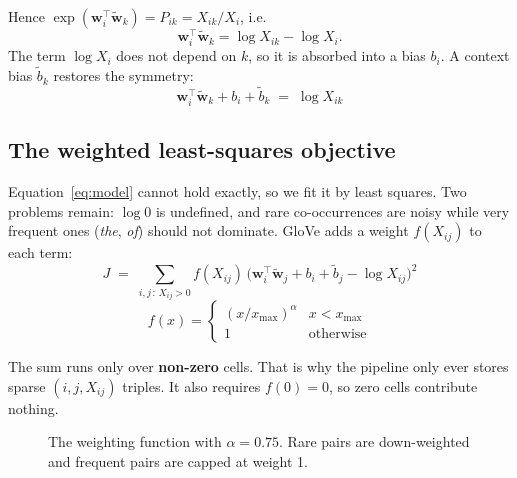 \documentclass[11pt,a4paper]{article}
\newcommand{\file}[1]{\texttt{#1}}
\newcommand{\wv}{\mathbf{w}}
\newcommand{\cv}{\tilde{\mathbf{w}}}
\begin{document}
Hence $\exp(\wv_i^\top\cv_k)=P_{ik}=X_{ik}/X_i$, i.e.
\[
  \wv_i^\top\cv_k = \log X_{ik} - \log X_i.
\]
The term $\log X_i$ does not depend on $k$, so it is absorbed into a bias $b_i$. A context
bias $\tilde b_k$ restores the symmetry:
\begin{equation}
  \boxed{\;\wv_i^\top\cv_k + b_i + \tilde b_k \;=\; \log X_{ik}\;}
  \label{eq:model}
\end{equation}

\subsection{The weighted least-squares objective}

Equation~\eqref{eq:model} cannot hold exactly, so we fit it by least squares. Two problems
remain: $\log 0$ is undefined, and rare co-occurrences are noisy while very frequent ones
(\emph{the}, \emph{of}) should not dominate. GloVe adds a weight $f(X_{ij})$ to each term:
\begin{equation}
  J \;=\; \sum_{i,j\,:\,X_{ij}>0} f(X_{ij})\,\Big(\wv_i^\top\cv_j + b_i + \tilde b_j - \log X_{ij}\Big)^2
  \label{eq:loss}
\end{equation}
\begin{equation}
  f(x) = \begin{cases} (x/x_{\max})^{\alpha} & x < x_{\max}\\ 1 & \text{otherwise}\end{cases}
  \label{eq:weight}
\end{equation}

The sum runs only over \textbf{non-zero} cells. That is why the pipeline only ever stores
sparse $(i,j,X_{ij})$ triples. It also requires $f(0)=0$, so zero cells contribute nothing.

\begin{figure}[h]
\centering
{}
\caption{The weighting function with $\alpha=0.75$. Rare pairs are down-weighted and
frequent pairs are capped at weight 1.}
\end{figure}
\end{document}
